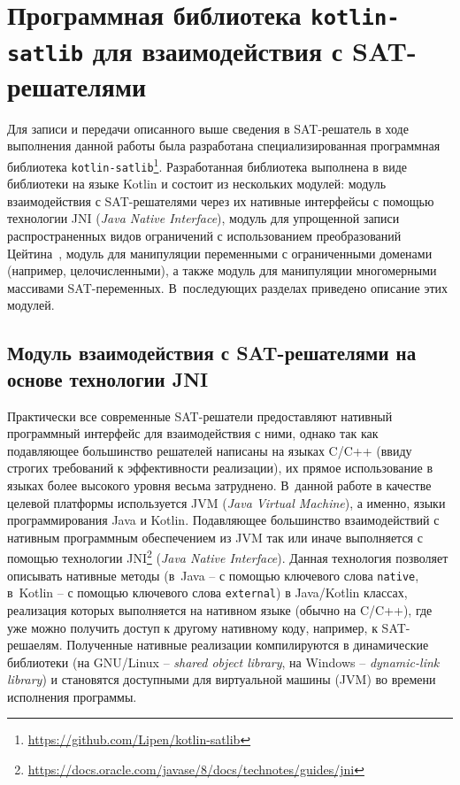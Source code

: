 \section{Программная библиотека \texttt{kotlin-satlib} для взаимодействия с SAT-решателями}
\label{sec:kotlin-satlib}

Для записи и передачи описанного выше сведения в SAT-решатель в ходе выполнения данной работы была разработана специализированная программная библиотека \texttt{kotlin-satlib}\footnote{\url{https://github.com/Lipen/kotlin-satlib}}.
Разработанная библиотека выполнена в виде библиотеки на языке Kotlin и состоит из нескольких модулей: модуль взаимодействия с SAT-решателями через их нативные интерфейсы с помощью технологии JNI (\textit{Java Native Interface}), модуль для упрощенной записи распространенных видов ограничений с использованием преобразований Цейтина~\cite{tseitin1970}, модуль для манипуляции переменными с ограниченными доменами (например, целочисленными), а также модуль для манипуляции многомерными массивами SAT-переменных.
В~последующих разделах приведено описание этих модулей.

\subsection{Модуль взаимодействия с SAT-решателями на основе технологии JNI}

Практически все современные SAT-решатели предоставляют нативный программный интерфейс для взаимодействия с ними, однако так как подавляющее большинство решателей написаны на языках C/C++ (ввиду строгих требований к эффективности реализации), их прямое использование в языках более высокого уровня весьма затруднено.
В~данной работе в качестве целевой платформы используется JVM (\textit{Java Virtual Machine}), а именно, языки программирования Java и Kotlin.
Подавляющее большинство взаимодействий с нативным программным обеспечением из JVM так или иначе выполняется с помощью технологии JNI\footnote{\href{https://docs.oracle.com/javase/8/docs/technotes/guides/jni/}{https://docs.oracle.com/javase/8/docs/technotes/guides/jni}} (\textit{Java Native Interface}).
Данная технология позволяет описывать нативные методы (в~Java \--- с помощью ключевого слова \texttt{native}, в~Kotlin \--- с помощью ключевого слова \texttt{external}) в Java/Kotlin классах, реализация которых выполняется на нативном языке (обычно на C/C++), где уже можно получить доступ к другому нативному коду, например, к SAT-решаелям.
Полученные нативные реализации компилируются в динамические библиотеки (на GNU/Linux \--- \textit{shared object library}, на Windows \--- \textit{dynamic-link library}) и становятся доступными для виртуальной машины (JVM) во времени исполнения программы.

